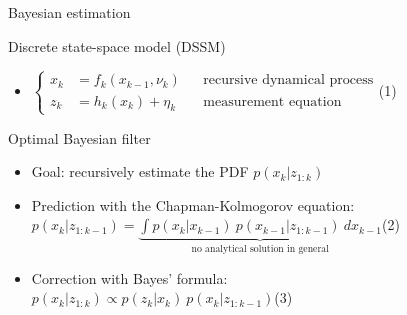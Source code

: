 \documentclass[9pt]{beamer}
\begin{document}
\begin{frame}{Bayesian estimation}

\begin{block}{Discrete state-space model (DSSM)}
    \begin{itemize}
    \item\hfill$\left\{\begin{aligned}
    x_k&=f_k(x_{k-1},\nu_k)&&\text{recursive dynamical process}\\
    z_k&=h_k(x_k)+\eta_k&&\text{measurement equation}
    \end{aligned}\right.$\hfill(1)
    \end{itemize}
\end{block}

\begin{block}{Optimal Bayesian filter}
    \begin{itemize}
    \item Goal: recursively estimate the PDF $p(x_k|z_{1:k})$
    \item Prediction with the Chapman-Kolmogorov equation:\\
    \hfill$\displaystyle p(x_k|z_{1:k-1})=\underbrace{\int p(x_k|x_{k-1})\:p(x_{k-1}|z_{1:k-1})\:dx_{k-1}}_{\text{no analytical solution in general}}$\hfill(2)
    \item Correction with Bayes' formula:\\
    \hfill$\displaystyle p(x_k|z_{1:k})\propto p(z_k|x_k)\:p(x_k|z_{1:k-1})$\hfill(3)
    \end{itemize}
\end{block}

\end{frame}
\end{document}
